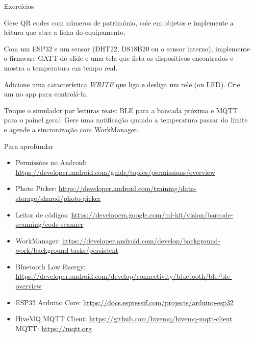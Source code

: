 \documentclass[aspectratio=169,10pt]{beamer}
\begin{document}
\begin{frame}{Exercícios}
  \begin{exercicio}
    Gere QR codes com números de patrimônio, cole em objetos e implemente a leitura que abre a ficha do equipamento.
  \end{exercicio}
  \begin{exercicio}
    Com um ESP32 e um sensor (DHT22, DS18B20 ou o sensor interno), implemente o firmware GATT do slide e uma tela que lista os dispositivos encontrados e mostra a temperatura em tempo real.
  \end{exercicio}
  \begin{exercicio}
    Adicione uma característica \emph{WRITE} que liga e desliga um relé (ou LED). Crie um  no app para controlá-la.
  \end{exercicio}
  \begin{projeto}
    Troque o simulador por leituras reais: BLE para a bancada próxima e MQTT para o painel geral. Gere uma notificação quando a temperatura passar do limite e agende a sincronização com WorkManager.
  \end{projeto}
\end{frame}

\begin{frame}{Para aprofundar}
  \small
  \begin{itemize}
    \item Permissões no Android: \url{https://developer.android.com/guide/topics/permissions/overview}
    \item Photo Picker: \url{https://developer.android.com/training/data-storage/shared/photo-picker}
    \item Leitor de códigos: \url{https://developers.google.com/ml-kit/vision/barcode-scanning/code-scanner}
    \item WorkManager: \url{https://developer.android.com/develop/background-work/background-tasks/persistent}
    \item Bluetooth Low Energy: \url{https://developer.android.com/develop/connectivity/bluetooth/ble/ble-overview}
    \item ESP32 Arduino Core: \url{https://docs.espressif.com/projects/arduino-esp32}
    \item HiveMQ MQTT Client: \url{https://github.com/hivemq/hivemq-mqtt-client} \quad MQTT: \url{https://mqtt.org}
  \end{itemize}
\end{frame}

\end{document}
